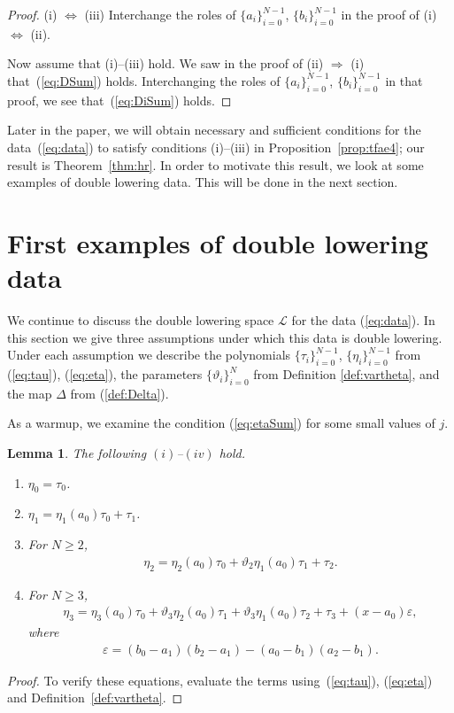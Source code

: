 \documentclass[pdftex]{sigma}
\numberwithin{equation}{section}
\newtheorem{Lemma}[Theorem]{Lemma}
\begin{document}
\begin{proof}
(i) $\Leftrightarrow$ (iii)
Interchange the roles of
$\lbrace a_i\rbrace_{i=0}^{N-1}$,
$\lbrace b_i\rbrace_{i=0}^{N-1}$ in the proof of
(i) $\Leftrightarrow$ (ii).

Now assume that (i)--(iii) hold. We saw in
the proof of
(ii) $\Rightarrow$ (i) that~(\ref{eq:DSum}) holds.
Interchanging the roles of
$\lbrace a_i\rbrace_{i=0}^{N-1}$,
$\lbrace b_i\rbrace_{i=0}^{N-1}$ in that proof, we see that~(\ref{eq:DiSum}) holds.
\end{proof}

Later in the paper, we will obtain necessary and sufficient
conditions for the data~(\ref{eq:data}) to satisfy conditions
(i)--(iii)
in Proposition~\ref{prop:tfae4}; our result is Theorem~\ref{thm:hr}.
In order to motivate this result,
we look at some examples of double lowering data.
This will be done in the next section.

\section{First examples of double lowering data}\label{section6}

We continue to discuss the double lowering
space $\mathcal L$ for
the data (\ref{eq:data}). In this section we give
three assumptions under which this data is double lowering.
Under each assumption we describe the polynomials
$\lbrace \tau_i\rbrace_{i=0}^{N-1}$,
$\lbrace \eta_i\rbrace_{i=0}^{N-1}$ from
(\ref{eq:tau}),
(\ref{eq:eta}),
the parameters $\lbrace \vartheta_i \rbrace_{i=0}^{N}$
from Definition
\ref{def:vartheta},
and the
map $\Delta$ from
(\ref{def:Delta}).

As a warmup, we examine the condition (\ref{eq:etaSum}) for some small values of $j$.

\begin{Lemma}\label{lem:Prop}
The following $(i)$--$(iv)$ hold.
\begin{enumerate}\itemsep=0pt
\item[$(i)$] $\eta_0 = \tau_0$.
\item[$(ii)$]
 $\eta_1 = \eta_1(a_0)\tau_0 + \tau_1$.
\item[$(iii)$] For $N\geq 2$,
\begin{gather*}
\eta_2 = \eta_2(a_0)\tau_0 + \vartheta_2 \eta_1(a_0) \tau_1 + \tau_2.
\end{gather*}
\item[$(iv)$] For $N\geq 3$,
\begin{gather*}
\eta_3 = \eta_3(a_0)\tau_0 +
\vartheta_3 \eta_2(a_0) \tau_1+
\vartheta_3 \eta_1(a_0) \tau_2+
\tau_3 +(x - a_0) \varepsilon,
\end{gather*}
where
\begin{gather*}
\varepsilon =
(b_0 - a_1)(b_2-a_1)-
(a_0 - b_1)(a_2-b_1).
\end{gather*}
\end{enumerate}
\end{Lemma}
\begin{proof} To verify these equations, evaluate the terms using~(\ref{eq:tau}), (\ref{eq:eta}) and Definition~\ref{def:vartheta}.
\end{proof}
\end{document}
